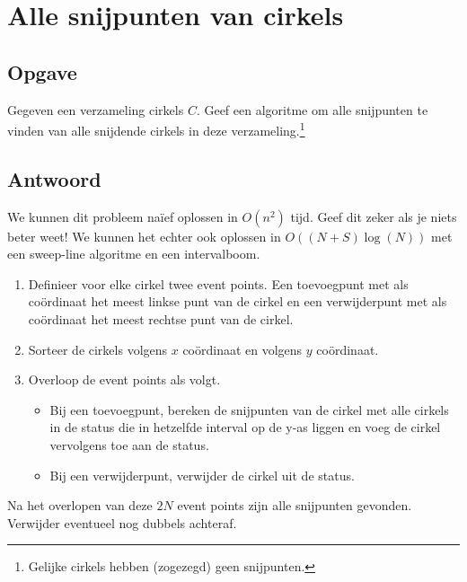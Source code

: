 \documentclass[examenvragen.tex]{subfiles}
\begin{document}
\section{Alle snijpunten van cirkels}
\subsection{Opgave}
Gegeven een verzameling cirkels $C$. Geef een algoritme om alle snijpunten te vinden van alle snijdende cirkels in deze verzameling.\footnote{Gelijke cirkels hebben (zogezegd) geen snijpunten.}

\subsection{Antwoord}
We kunnen dit probleem na\"ief oplossen in $O(n^2)$ tijd. Geef dit zeker als je niets beter weet! We kunnen het echter ook oplossen in $O((N+S)\log(N))$ met een sweep-line algoritme en een intervalboom.

\begin{enumerate}
\item Definieer voor elke cirkel twee event points. Een toevoegpunt met als co\"ordinaat het meest linkse punt van de cirkel en een verwijderpunt met als co\"ordinaat het meest rechtse punt van de cirkel.
\item Sorteer de cirkels volgens $x$ co\"ordinaat en volgens $y$ co\"ordinaat.
\item Overloop de event points als volgt.
\begin{itemize}
\item Bij een toevoegpunt, bereken de snijpunten van de cirkel met alle cirkels in de status die in hetzelfde interval op de y-as liggen en voeg de cirkel vervolgens toe aan de status.
\item Bij een verwijderpunt, verwijder de cirkel uit de status.
\end{itemize}
\end{enumerate}
Na het overlopen van deze $2N$ event points zijn alle snijpunten gevonden. Verwijder eventueel nog dubbels achteraf.
\end{document}
